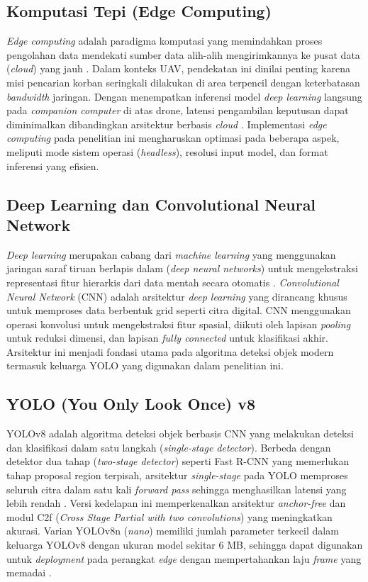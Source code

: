 \subsection{Komputasi Tepi (Edge Computing)}
\textit{Edge computing} adalah paradigma komputasi yang memindahkan proses pengolahan data mendekati sumber data alih-alih mengirimkannya ke pusat data (\textit{cloud}) yang jauh \cite{Shi2016EdgeComputing}. Dalam konteks UAV, pendekatan ini dinilai penting karena misi pencarian korban seringkali dilakukan di area terpencil dengan keterbatasan \textit{bandwidth} jaringan. Dengan menempatkan inferensi model \textit{deep learning} langsung pada \textit{companion computer} di atas drone, latensi pengambilan keputusan dapat diminimalkan dibandingkan arsitektur berbasis \textit{cloud} \cite{Chen2019DeepEdge, Mao2021EdgeUAV}. Implementasi \textit{edge computing} pada penelitian ini mengharuskan optimasi pada beberapa aspek, meliputi mode sistem operasi (\textit{headless}), resolusi input model, dan format inferensi yang efisien.

\subsection{Deep Learning dan Convolutional Neural Network}
\textit{Deep learning} merupakan cabang dari \textit{machine learning} yang menggunakan jaringan saraf tiruan berlapis dalam (\textit{deep neural networks}) untuk mengekstraksi representasi fitur hierarkis dari data mentah secara otomatis \cite{LeCun2015DeepLearning}. \textit{Convolutional Neural Network} (CNN) adalah arsitektur \textit{deep learning} yang dirancang khusus untuk memproses data berbentuk grid seperti citra digital. CNN menggunakan operasi konvolusi untuk mengekstraksi fitur spasial, diikuti oleh lapisan \textit{pooling} untuk reduksi dimensi, dan lapisan \textit{fully connected} untuk klasifikasi akhir. Arsitektur ini menjadi fondasi utama pada algoritma deteksi objek modern termasuk keluarga YOLO yang digunakan dalam penelitian ini.

\subsection{YOLO (You Only Look Once) v8}
YOLOv8 adalah algoritma deteksi objek berbasis CNN yang melakukan deteksi dan klasifikasi dalam satu langkah (\textit{single-stage detector}). Berbeda dengan detektor dua tahap (\textit{two-stage detector}) seperti Fast R-CNN yang memerlukan tahap proposal region terpisah, arsitektur \textit{single-stage} pada YOLO memproses seluruh citra dalam satu kali \textit{forward pass} sehingga menghasilkan latensi yang lebih rendah \cite{Terven2023YOLOv8Review}. Versi kedelapan ini memperkenalkan arsitektur \textit{anchor-free} dan modul C2f (\textit{Cross Stage Partial with two convolutions}) yang meningkatkan akurasi. Varian YOLOv8n (\textit{nano}) memiliki jumlah parameter terkecil dalam keluarga YOLOv8 dengan ukuran model sekitar 6 MB, sehingga dapat digunakan untuk \textit{deployment} pada perangkat \textit{edge} dengan mempertahankan laju \textit{frame} yang memadai \cite{Zhou2024SODYOLOv8}.

